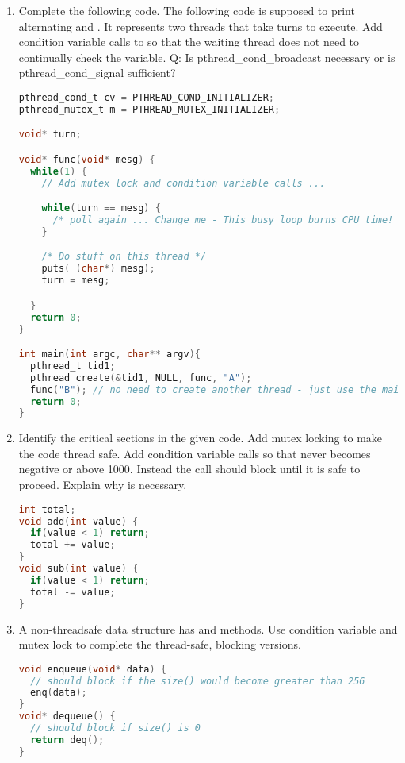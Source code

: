 \begin{enumerate}
\item Complete the following code. The following code is supposed to print alternating  and . It represents two threads that take turns to execute. Add condition variable calls to  so that the waiting thread does not need to continually check the  variable. Q: Is pthread\_cond\_broadcast necessary or is pthread\_cond\_signal sufficient?

\begin{lstlisting}[language=C]
pthread_cond_t cv = PTHREAD_COND_INITIALIZER;
pthread_mutex_t m = PTHREAD_MUTEX_INITIALIZER;

void* turn;

void* func(void* mesg) {
  while(1) {
    // Add mutex lock and condition variable calls ...

    while(turn == mesg) {
      /* poll again ... Change me - This busy loop burns CPU time! */
    }

    /* Do stuff on this thread */
    puts( (char*) mesg);
    turn = mesg;

  }
  return 0;
}

int main(int argc, char** argv){
  pthread_t tid1;
  pthread_create(&tid1, NULL, func, "A");
  func("B"); // no need to create another thread - just use the main thread
  return 0;
}
\end{lstlisting}

\item Identify the critical sections in the given code. Add mutex locking to make the code thread safe. Add condition variable calls so that  never becomes negative or above 1000. Instead the call should block until it is safe to proceed. Explain why  is necessary.

\begin{lstlisting}[language=C]
int total;
void add(int value) {
  if(value < 1) return;
  total += value;
}
void sub(int value) {
  if(value < 1) return;
  total -= value;
}
\end{lstlisting}

\item A non-threadsafe data structure has   and  methods. Use condition variable and mutex lock to complete the thread-safe, blocking versions.

\begin{lstlisting}[language=C]
void enqueue(void* data) {
  // should block if the size() would become greater than 256
  enq(data);
}
void* dequeue() {
  // should block if size() is 0
  return deq();
}
\end{lstlisting}


\end{enumerate}
